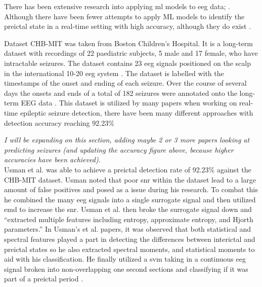 \documentclass[12pt]{article}
\begin{document}
There has been extensive research into applying \acrshort{ml} models to \acrshort{eeg} data; \cite{shoeb2010application} \cite{chakraborti2018machine}\cite{kumar2014machine} \cite{shen2022eeg} \cite{gupta2019epileptic} \cite{samiee2015long} \cite{zabihi2015analysis} \cite{wang2021one} \cite{zarei2021automatic} \cite{li2021seizure} \cite{shoeb2009application} \cite{wong2023eeg}. \\ Although there have been fewer attempts to apply ML models to identify the preictal state in a real-time setting with high accuracy, although they do exist \cite{usman2017epileptic}. 

Dataset CHB-MIT \cite{shoeb2009application} \cite{PhysioNet} was taken from Boston Children's Hospital. It is a long-term dataset with recordings of 22 paediatric subjects, 5 male and 17 female, who have intractable seizures. The dataset contains 23 \acrshort{eeg} signals positioned on the scalp in the international 10-20 \acrshort{eeg} system \cite{sharbrough1991american}. The dataset is labelled with the timestamps of the onset and ending of each seizure. Over the course of several days the onsets and ends of a total of 182 seizures were annotated onto the long-term EEG data \cite{shoeb2009application} \cite{PhysioNet}. This dataset is utilized by many papers when working on real-time epileptic seizure detection, there have been many different approaches with detection accuracy reaching 92.23\% \cite{usman2017epileptic}

\textit{I will be expanding on this section, adding maybe 2 or 3 more papers looking at predicting seizures (and updating the accuracy figure above, because higher accuracies have been achieved).} \\

Usman et al. was able to achieve a preictal detection rate of 92.23\% against the CHB-MIT dataset. \cite{usman2017epileptic} Usman noted that poor \acrfull{snr} within the dataset lead to a large amount of false positives and posed as a issue during his research. To combat this he combined the many \acrshort{eeg} signals into a single surrogate signal and then utilized \acrfull{emd} to increase the \acrshort{snr}. Usman et al. then broke the surrogate signal down and ``extracted multiple features including entropy, approximate entropy, and Hjorth parameters.'' In Usman's et al. papers, it was observed that both statistical and spectral features played a part in detecting the differences between interictal and preictal states so he also extracted spectral moments, and statistical moments to aid with his classification. He finally utilized a \acrfull{svm} taking in a continuous \acrshort{eeg} signal broken into non-overlapping one second sections and classifying if it was part of a preictal period \cite{usman2017epileptic}.
\end{document}
